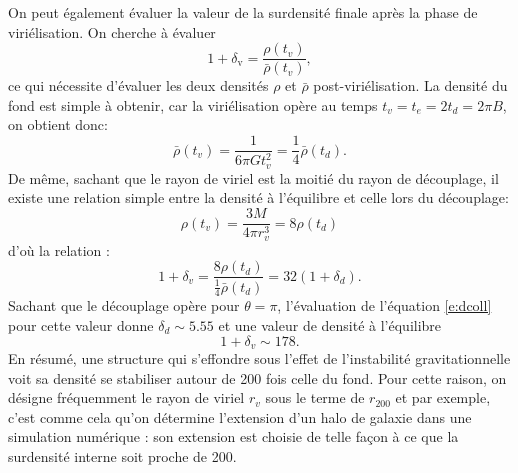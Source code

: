 On peut également évaluer la valeur de la surdensité finale après la phase de viriélisation. On cherche à évaluer
\begin{equation}
1+\delta_\mathrm{v}=\frac{\rho(t_v)}{\bar \rho(t_v)},
\end{equation}
ce qui nécessite d'évaluer les deux densités $\rho$ et $\bar \rho$ post-viriélisation. La densité du fond est simple à obtenir, car la viriélisation opère au temps $t_v=t_e=2t_d=2\pi B$, on obtient donc:
\begin{equation}
\bar \rho(t_v) = \frac{1}{6\pi G t_v^2}=\frac{1}{4}\bar \rho (t_d).
\end{equation} 
De même, sachant que le rayon de viriel est la moitié du rayon de découplage, il existe une relation simple entre la densité à l'équilibre et celle lors du découplage:
\begin{equation}
\rho(t_v)=\frac{3 M}{4\pi r_v^3}=8 \rho(t_d)
\end{equation}
d'où la relation :
\begin{equation}
1+ \delta_v=\frac{8 \rho(t_d)}{\frac{1}{4}\bar \rho (t_d)}=32(1+\delta_d).
\end{equation}
Sachant que le découplage opère pour $\theta =\pi$, l'évaluation de l'équation \ref{e:dcoll} pour cette valeur donne $\delta_d\sim 5.55$ et une valeur de densité à l'équilibre 
\begin{equation}
1+\delta_v \sim 178.
\end{equation} 
En résumé, une structure qui s'effondre sous l'effet de l'instabilité gravitationnelle voit sa densité se stabiliser autour de 200 fois celle du fond. Pour cette raison, on désigne fréquemment le rayon de viriel $r_v$ sous le terme de $r_{200}$ et par exemple, c'est comme cela qu'on détermine l'extension d'un halo de galaxie dans une simulation numérique : son extension est choisie de telle façon à ce que la surdensité interne soit proche de 200.

